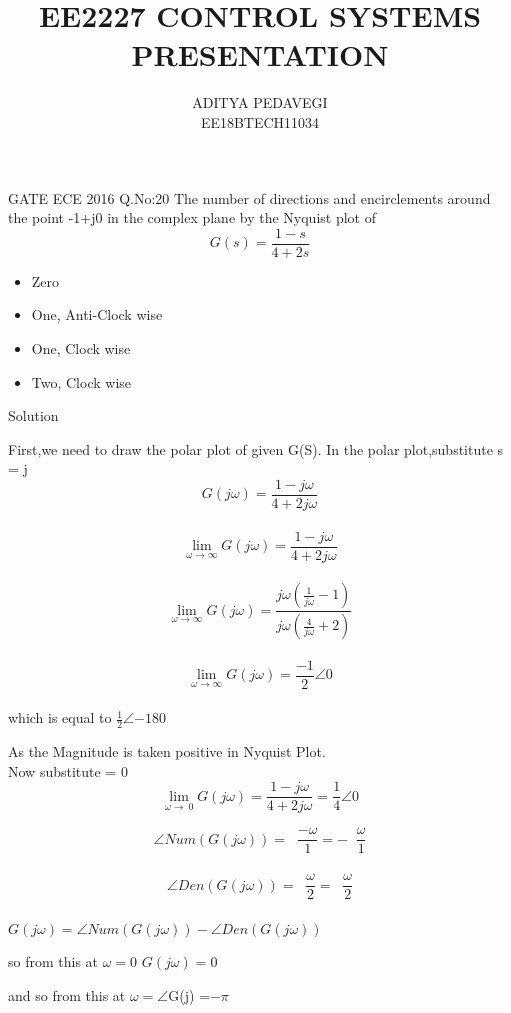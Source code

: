 \documentclass{beamer}
\title{EE2227 CONTROL SYSTEMS PRESENTATION}
\author{ADITYA PEDAVEGI\\EE18BTECH11034}
\DeclareMathOperator{\taninv}{tan^{-1}}
\begin{document}
\maketitle
\begin{frame}{GATE ECE 2016 Q.No:20}
The number of directions and encirclements around the point -1+j0 in the complex plane by the Nyquist plot of $$G(s) = \frac{1-s}{4+2s}$$

\bigskip
\begin{itemize}
    \item Zero
    \item One, Anti-Clock wise
    \item One, Clock wise
    \item Two, Clock wise
\end{itemize}
\end{frame}

\begin{frame}{Solution}

First,we need to draw the polar plot of given G(S).
In the polar plot,substitute s = j\omega
\\
$$ G(j\omega) = \frac{1-j\omega}{4+2j\omega} $$
\\
$$ \lim_{\omega\to\infty} G(j\omega) = \frac{1-j\omega}{4+2j\omega} $$
\\
$$ \lim_{\omega\to\infty} G(j\omega) = \frac{j\omega(\frac{1}{j\omega}-1)}{j\omega(\frac{4}{j\omega}+2)} $$ 
\\
$$ \lim_{\omega\to\infty} G(j\omega) = \frac{-1}{2}\angle 0 $$ 
\\

\centering which is equal to $\frac{1}{2}\angle{-180}$
\end{frame}

\begin{frame}
As the Magnitude is taken positive in Nyquist Plot.\\
Now substitute \omega = 0
\\
$$ \lim_{\omega\to\ 0} G(j\omega) = \frac{1-j\omega}{4+2j\omega} = \frac{1}{4}\angle 0 $$

$$\angle Num(G(j\omega)) = \taninv \frac{-\omega}{1} = -\taninv \frac{\omega}{1}$$
\\
$$\angle Den(G(j\omega)) = \taninv \frac{\omega}{2} = \taninv \frac{\omega}{2}$$
\\
\angle $G(j\omega) = \angle Num(G(j\omega)) - \angle Den(G(j\omega))$

\bigskip
so from this  at $\omega = 0$ \angle $G(j\omega) = 0$

\bigskip
and so from this  at $\omega = $\infty$ \angle $G(j\omega)  =$-\pi$     
\end{frame}
\end{document}
